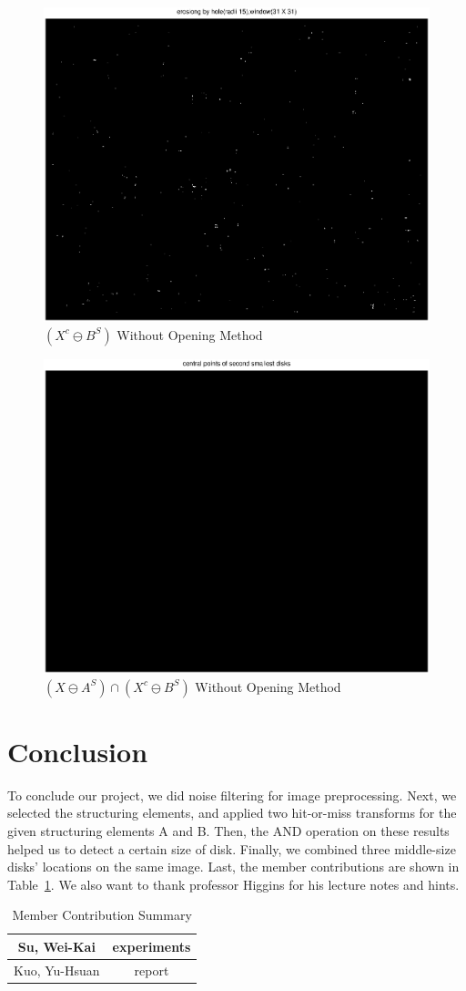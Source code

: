 \documentclass[paper=a4, fontsize=11pt]{scrartcl}
\begin{document}
\begin{figure}
	\centering
	\includegraphics[width=12cm]{D1.eps}
	\caption{ $( X^c \ominus B^S)$ Without Opening Method}
	\label{fig:18}
\end{figure}

\begin{figure}
	\centering
	\includegraphics[width=12cm]{And.eps}
	\caption{ $( X \ominus A^S) \cap ( X^c \ominus B^S)$ Without Opening Method}
	\label{fig:19}
\end{figure}




\section{Conclusion}
To conclude our project, we did noise filtering for image preprocessing. Next, we selected the structuring elements, and applied two hit-or-miss transforms for the given structuring elements A and B. Then, the AND operation on these results helped us to detect a certain size of disk. Finally, we combined three middle-size disks' locations on the same image. Last, the member contributions are shown in Table~\ref{tab:contr}. We also want to thank professor Higgins for his lecture notes and hints.

\begin{table}
	\centering
	\caption{Member Contribution Summary}
	\begin{tabular}{c|c} \hline
       Su, Wei-Kai & experiments \\ \hline
	Kuo, Yu-Hsuan & report \\ \hline
	
	\end{tabular}
	\label{tab:contr}
\end{table}
\end{document}
